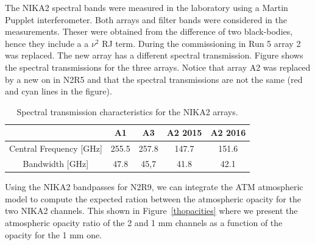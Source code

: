 The NIKA2 spectral bands were measured in the laboratory using a Martin Pupplet interferometer.
Both arrays and filter bands were considered in the measurements. Theser were obtained from the difference of two black-bodies, hence they include a a $\nu^2$ RJ term. During the commissioning in Run 5 array 2 was replaced. The new array has a different spectral transmission. Figure shows the spectral transmissions for the three arrays. Notice that array A2 was replaced by a new on in N2R5 and that the spectral transmissions are not the same (red and cyan lines in the figure).


\begin{table}[h]
\caption{Spectral transmission characteristics for the NIKA2 arrays.%
\label{nika2runs}}
\begin{tabular}{|c|c|c|c|c|}
\hline 
  &     A1  &  A3 &  A2 2015 & A2 2016 \\ 
\hline 
Central Frequency [GHz] &   255.5  & 257.8   &   147.7  & 151.6 \\  
Bandwidth [GHz]         &   47.8   & 45,7    &   41.8   & 42.1 \\
\hline 
\end{tabular} 
\end{table} 



Using the NIKA2 bandpasses for N2R9, we can integrate the ATM atmospheric model to compute the expected ration between the atmospheric opacity for the two NIKA2 channels. This shown in Figure~\ref{thopacities} where we present the atmospheric opacity ratio of the 2 and 1 mm channels as a function of the opacity for the 1 mm one.


